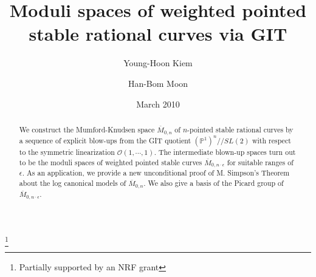 \documentclass[10pt]{amsart}
\theoremstyle{definition}
\newcommand{\PP}{\mathbb{P}}
\newcommand{\cO}{\mathcal{O} }
\def\Mzn{\overline{M}_{0,n} }
\def\Mze{\overline{M}_{0,n\cdot \epsilon} }
\def\git{/\!/ }
\begin{document}
\title[Moduli spaces of weighted pointed
stable rational curves]{Moduli spaces of weighted pointed stable
rational curves via GIT}
\date{March 2010}


\author{Young-Hoon Kiem}
\address{Department of Mathematics and Research Institute
of Mathematics, Seoul National University, Seoul 151-747, Korea}

\author{Han-Bom Moon}
\address{Department of Mathematics, Seoul National University, Seoul 151-747, Korea}

\thanks{Partially supported by an NRF grant}

\begin{abstract}
We construct the Mumford-Knudsen space $\Mzn$ of $n$-pointed
stable rational curves by a sequence of explicit blow-ups from the
GIT quotient $(\PP^1)^n\git SL(2)$ with respect to the symmetric
linearization $\cO(1,\cdots,1)$. The intermediate blown-up spaces
turn out to be the moduli spaces of weighted pointed stable curves
$\Mze$ for suitable ranges of $\epsilon$. As an application, we
provide a new unconditional proof of M. Simpson's Theorem about
the log canonical models of $\Mzn$. We also give a basis of the
Picard group of $\Mze$.
\end{abstract}

\maketitle



\end{document}
